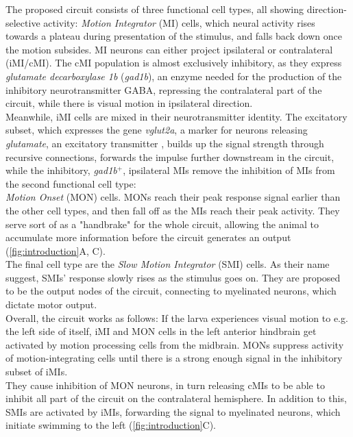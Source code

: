 \documentclass[12pt, a4paper, oneside]{article}
\begin{document}
The proposed circuit consists of three functional cell types, all showing direction-selective activity: \textit{Motion Integrator} (MI) cells, which neural activity rises towards a plateau during presentation of the stimulus, and falls back down once the motion subsides. 
MI neurons can either project ipsilateral or contralateral (iMI/cMI). The cMI population is almost exclusively inhibitory, as they express \textit{glutamate decarboxylase 1b} (\textit{gad1b}), an enzyme needed for the production of the inhibitory neurotransmitter GABA, repressing the contralateral part of the circuit, while there is visual motion in ipsilateral direction.\\
Meanwhile, iMI cells are mixed in their neurotransmitter identity. The excitatory subset, which expresses the gene \textit{vglut2a}, a marker for neurons releasing \textit{glutamate}, an excitatory transmitter \parencite{higashijimaDistributionProspectiveGlutamatergic2004}, builds up the signal strength through recursive connections, forwards the impulse further downstream in the circuit, while the inhibitory, \textit{gad1b$^+$}, ipsilateral MIs remove the inhibition of MIs from the second functional cell type:\\
\textit{Motion Onset} (MON) cells. MONs reach their peak response signal earlier than the other cell types, and then fall off as the MIs reach their peak activity. They serve sort of as a "handbrake" for the whole circuit, allowing the animal to accumulate more information before the circuit generates an output (\autoref{fig:introduction}A, C).\\
The final cell type are the \textit{Slow Motion Integrator} (SMI) cells. 
As their name suggest, SMIs' response slowly rises as the stimulus goes on. They are proposed to be the output nodes of the circuit, connecting to myelinated neurons, which dictate motor output.\\

Overall, the circuit works as follows: If the larva experiences visual motion to e.g. the left side of itself, iMI and MON cells in the left anterior hindbrain get activated by motion processing cells from the midbrain. MONs suppress activity of motion-integrating cells until there is a strong enough signal in the inhibitory subset of iMIs.\\
They cause inhibition of MON neurons, in turn releasing cMIs to be able to inhibit all part of the circuit on the contralateral hemisphere. In addition to this, SMIs are activated by iMIs, forwarding the signal to myelinated neurons, which initiate swimming to the left (\autoref{fig:introduction}C).\\
\end{document}

